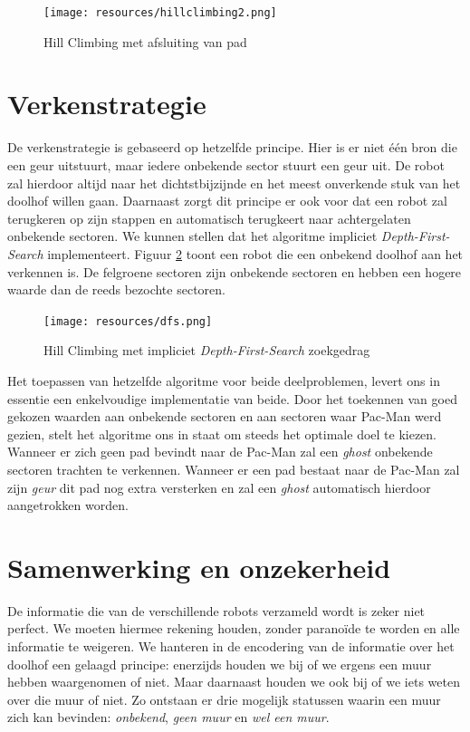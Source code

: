 \documentclass[12pt,a4paper]{report}
\begin{document}
\begin{figure}[htbp]
  \centering
  \texttt{[image: resources/hillclimbing2.png]}
  \caption{Hill Climbing met afsluiting van pad}
  \label{fig:hillclimbing2}
\end{figure}

\section{Verkenstrategie}

De verkenstrategie is gebaseerd op hetzelfde principe. Hier is er niet \'e\'en bron die een geur uitstuurt, maar iedere onbekende sector stuurt een geur uit. De robot zal hierdoor altijd naar het dichtstbijzijnde en het meest onverkende stuk van het doolhof willen gaan. Daarnaast zorgt dit principe er ook voor dat een robot zal terugkeren op zijn stappen en automatisch terugkeert naar achtergelaten onbekende sectoren. We kunnen stellen dat het algoritme impliciet \emph{Depth-First-Search} implementeert. Figuur \ref{fig:dfs} toont een robot die een onbekend doolhof aan het verkennen is. De felgroene sectoren zijn onbekende sectoren en hebben een hogere waarde dan de reeds bezochte sectoren.

\begin{figure}[htbp]
  \centering
  \texttt{[image: resources/dfs.png]}
  \caption{Hill Climbing met impliciet \emph{Depth-First-Search} zoekgedrag}
  \label{fig:dfs}
\end{figure}

Het toepassen van hetzelfde algoritme voor beide deelproblemen, levert ons in essentie een enkelvoudige implementatie van beide. Door het toekennen van goed gekozen waarden aan onbekende sectoren en aan sectoren waar Pac-Man werd gezien, stelt het algoritme ons in staat om steeds het optimale doel te kiezen. Wanneer er zich geen pad bevindt naar de Pac-Man zal een \emph{ghost} onbekende sectoren trachten te verkennen. Wanneer er een pad bestaat naar de Pac-Man zal zijn \emph{geur} dit pad nog extra versterken en zal een \emph{ghost} automatisch hierdoor aangetrokken worden.

\section{Samenwerking en onzekerheid}

De informatie die van de verschillende robots verzameld wordt is zeker niet perfect. We moeten hiermee rekening houden, zonder parano\"ide te worden en alle informatie te weigeren. We hanteren in de encodering van de informatie over het doolhof een gelaagd principe: enerzijds houden we bij of we ergens een muur hebben waargenomen of niet. Maar daarnaast houden we ook bij of we iets weten over die muur of niet. Zo ontstaan er drie mogelijk statussen waarin een muur zich kan bevinden: \emph{onbekend}, \emph{geen muur} en \emph{wel een muur}.
\end{document}
